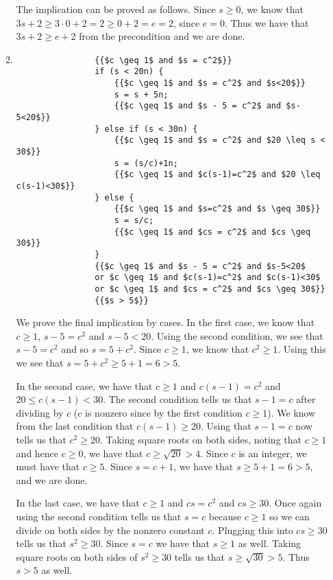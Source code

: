 \documentclass[12pt]{article}
\theoremstyle{definitionstyle}
\begin{document}
\begin{enumerate}[labelindent=0pt, labelwidth=!, wide]
\begin{enumerate}[leftmargin=0pt, label=(\alph*), labelindent=0pt, labelwidth=!, wide]
            The implication can be proved as follows. Since $s \geq 0$, we know that $3s + 2 \geq 3 \cdot 0 + 2 = 2 \geq 0 + 2 = e = 2$, since $e = 0$. Thus we have that $3s+2 \geq e+2$ from the precondition and we are done.
            \item \begin{lstlisting}
                {{$c \geq 1$ and $s = c^2$}}
                if (s < 20n) {
                    {{$c \geq 1$ and $s = c^2$ and $s<20$}}
                    s = s + 5n;
                    {{$c \geq 1$ and $s - 5 = c^2$ and $s-5<20$}}
                } else if (s < 30n) {
                    {{$c \geq 1$ and $s = c^2$ and $20 \leq s < 30$}}
                    s = (s/c)+1n;
                    {{$c \geq 1$ and $c(s-1)=c^2$ and $20 \leq c(s-1)<30$}}
                } else {
                    {{$c \geq 1$ and $s=c^2$ and $s \geq 30$}}
                    s = s/c;
                    {{$c \geq 1$ and $cs = c^2$ and $cs \geq 30$}}
                }
                {{$c \geq 1$ and $s - 5 = c^2$ and $s-5<20$ 
                or $c \geq 1$ and $c(s-1)=c^2$ and $c(s-1)<30$ 
                or $c \geq 1$ and $cs = c^2$ and $cs \geq 30$}}
                {{$s > 5$}}
            \end{lstlisting}
            We prove the final implication by cases. In the first case, we know that $c \geq 1$, $s-5=c^2$ and $s-5 < 20$. Using the second condition, we see that $s -5 = c^2$ and so $s = 5 + c^2$. Since $c \geq 1$, we know that $c^2 \geq 1$. Using this we see that $s = 5+c^2 \geq 5+1 = 6 > 5$. 
    
            In the second case, we have that $c \geq 1$ and $c(s-1) = c^2$ and $20 \leq c(s-1)<30$. The second condition tells us that $s-1 = c$ after dividing by $c$ ($c$ is nonzero since by the first condition $c \geq 1$). We know from the last condition that $c(s-1) \geq 20$. Using that $s-1=c$ now tells us that $c^2 \geq 20$. Taking square roots on both sides, noting that $c \geq 1$ and hence $c \geq 0$, we have that $c \geq \sqrt{20} > 4$. Since $c$ is an integer, we must have that $c \geq 5$. Since $s = c+1$, we have that $s \geq 5+1 = 6 > 5$, and we are done.
    
            In the last case, we have that $c \geq 1$ and $cs = c^2$ and $cs \geq 30$. Once again using the second condition tells us that $s = c$ because $c \geq 1$ so we can divide on both sides by the nonzero constant $c$. Plugging this into $cs \geq 30$ tells us that $s^2 \geq 30$. Since $s=c$ we have that $s \geq 1$ as well. Taking square roots on both sides of $s^2 \geq 30$ tells us that $s \geq \sqrt{30} > 5$. Thus $s > 5$ as well.
        \end{enumerate}


\end{enumerate}
\end{document}

